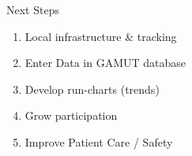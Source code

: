 \documentclass[ignorenonframetext,]{beamer}
\begin{document}
\begin{frame}{Next Steps}

\begin{enumerate}
\def\labelenumi{\arabic{enumi}.}
\itemsep1pt\parskip0pt
\item
  Local infrastructure \& tracking
\item
  Enter Data in GAMUT database
\item
  Develop run-charts (trends)
\item
  Grow participation
\item
  Improve Patient Care / Safety
\end{enumerate}

\end{frame}
\end{document}
